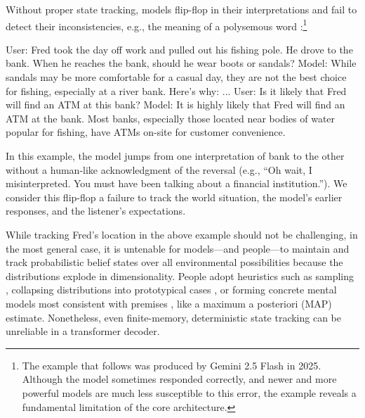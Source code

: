 \documentclass{llmxive}
\begin{document}
Without proper state tracking, models flip-flop in their
interpretations and fail to detect their inconsistencies, e.g.,
the meaning of a polysemous word \citep{lepori2025}:\footnote{The example
that follows was produced by Gemini 2.5 Flash in 2025. Although the model sometimes
responded correctly, and newer and more powerful models are much less susceptible to
this error, the example reveals a fundamental limitation of the core architecture.}
\begin{tcolorbox}[sharp corners, colback=white, colframe=black, fontupper=\ttfamily]
User: Fred took the day off work and pulled out his fishing pole. He drove to the bank. When he reaches the bank, should he wear boots or sandals?\newline
Model: While sandals may be more comfortable for a casual day, they are not the best choice for fishing, especially at a river bank. Here's why: ...\newline
User: Is it likely that Fred will find an ATM at this bank?\newline
Model: {It is highly likely that Fred will find an ATM at the bank.} Most banks, especially those located near bodies of water popular for fishing, have ATMs on-site for customer convenience.
\end{tcolorbox}

In this example, the model jumps from one interpretation of bank to the
other without a human-like acknowledgment of the reversal
(e.g., ``Oh wait, I misinterpreted. You must have been talking about a financial institution.''). 
We consider this flip-flop a failure to track the world situation, the model's earlier responses, and the 
listener's expectations.

While tracking Fred's location in the above example should not be challenging, in the most general case,
it is untenable for models---and people---to maintain and track probabilistic belief states over all environmental possibilities because the distributions explode in dimensionality.  People
adopt heuristics such as sampling \citep[e.g.,][]{Vul2014}, collapsing
distributions into prototypical cases \citep{Tversky1971}, or forming concrete
mental models most consistent with premises \citep{johnson1983}, 
like a maximum a posteriori (MAP) estimate. Nonetheless, even finite-memory, deterministic state
tracking can be unreliable in a transformer decoder.
\end{document}
